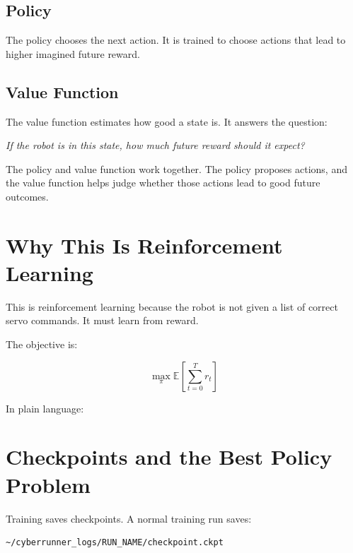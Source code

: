 \documentclass[11pt]{article}
\begin{document}
\subsection{Policy}

The policy chooses the next action. It is trained to choose actions that lead to higher imagined future reward.

\subsection{Value Function}

The value function estimates how good a state is. It answers the question:

\begin{center}
\emph{If the robot is in this state, how much future reward should it expect?}
\end{center}

The policy and value function work together. The policy proposes actions, and the value function helps judge whether those actions lead to good future outcomes.

\section{Why This Is Reinforcement Learning}

This is reinforcement learning because the robot is not given a list of correct servo commands. It must learn from reward.

The objective is:

\begin{equation}
\max_\pi \mathbb{E}\left[\sum_{t=0}^{T} r_t\right]
\end{equation}

In plain language:

\begin{center}
\end{center}

\section{Checkpoints and the Best Policy Problem}

Training saves checkpoints. A normal training run saves:

\begin{lstlisting}
~/cyberrunner_logs/RUN_NAME/checkpoint.ckpt
\end{lstlisting}
\end{document}
